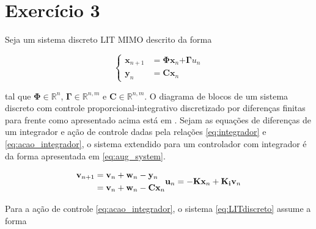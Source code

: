 \section*{Exercício 3}
\label{ex:3}
    
Seja um sistema discreto LIT MIMO descrito da forma 

\begin{equation}
    \begin{cases} \mathbf{x}_{n+1} &= \mathbf{\Phi} \mathbf{x}_n \mathbf{+ \Gamma} u_n \\ \mathbf{y}_n &= \mathbf{C} \mathbf{x}_n \end{cases}
    \label{eq:LITdiscreto}
\end{equation}

tal que $\mathbf{\Phi} \in \mathbb{R}^{n}$, $\mathbf{\Gamma} \in \mathbb{R}^{n, m}$ e $\mathbf{C} \in \mathbb{R}^{n, m}$. O diagrama de blocos de um sistema discreto com controle proporcional-integrativo discretizado por diferenças finitas para frente como apresentado acima está em \cite[9, p. 172]{controle_digital_2018}. Sejam as equações de diferenças de um integrador e ação de controle dadas pela relações \eqref{eq:integrador} e \eqref{eq:acao_integrador}, o sistema extendido para um controlador com integrador é da forma apresentada em \eqref{eq:aug_system}.

    \begin{subequations}
        \begin{equation} \label{eq:integrador}
            \begin{split}
                \mathbf{v}_{n+1} & = \mathbf{v}_{n} + \mathbf{w}_{n} - \mathbf{y}_{n} \\
                                 & = \mathbf{v}_{n} + \mathbf{w}_{n} - \mathbf{C} \mathbf{x}_n
            \end{split}
        \end{equation} \\
        \begin{equation} \label{eq:acao_integrador}
            \mathbf{u}_n = - \mathbf{K} \mathbf{x}_n + \mathbf{K_i} \mathbf{v}_n
        \end{equation}
    \end{subequations}
    
    Para a ação de controle \eqref{eq:acao_integrador}, o sistema \eqref{eq:LITdiscreto} assume a forma

